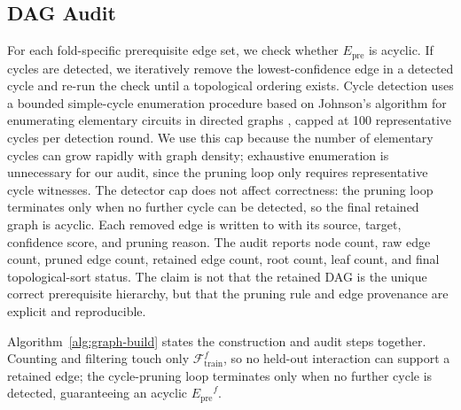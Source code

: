 \documentclass[pdflatex,sn-mathphys-num]{sn-jnl}
\newcommand{\Epre}{\ensuremath{E_{\text{pre}}}}
\newenvironment{revbox}{}{}
\begin{document}
\subsection{DAG Audit}
\label{sec:dag-audit}
For each fold-specific prerequisite edge set, we check whether $\Epre$
is acyclic. If cycles are detected, we iteratively remove the
lowest-confidence edge in a detected cycle and re-run the check until a
topological ordering exists. Cycle detection uses a bounded simple-cycle enumeration procedure based on
Johnson's algorithm for enumerating elementary circuits in directed graphs \cite{johnson1975finding}, capped at 100 representative cycles per detection round. We use this cap because the number of elementary cycles can grow rapidly with graph density; exhaustive enumeration is unnecessary for our
audit, since the pruning loop only requires representative cycle witnesses. The detector cap does not affect
correctness: the pruning loop terminates only when no further cycle can
be detected, so the final retained graph is acyclic. Each removed edge
is written to
 with its source,
target, confidence score, and pruning reason. The audit reports node
count, raw edge count, pruned edge count, retained edge count, root
count, leaf count, and final topological-sort status. The claim is not
that the retained DAG is the unique correct prerequisite hierarchy, but
that the pruning rule and edge provenance are explicit and reproducible.

\begin{revbox}
Algorithm~\ref{alg:graph-build} states the construction and audit steps
together. Counting and filtering touch only $\mathcal{F}^f_{\text{train}}$,
so no held-out interaction can support a retained edge; the cycle-pruning loop
terminates only when no further cycle is detected, guaranteeing an acyclic
$\Epre^f$.
\end{revbox}
\end{document}
